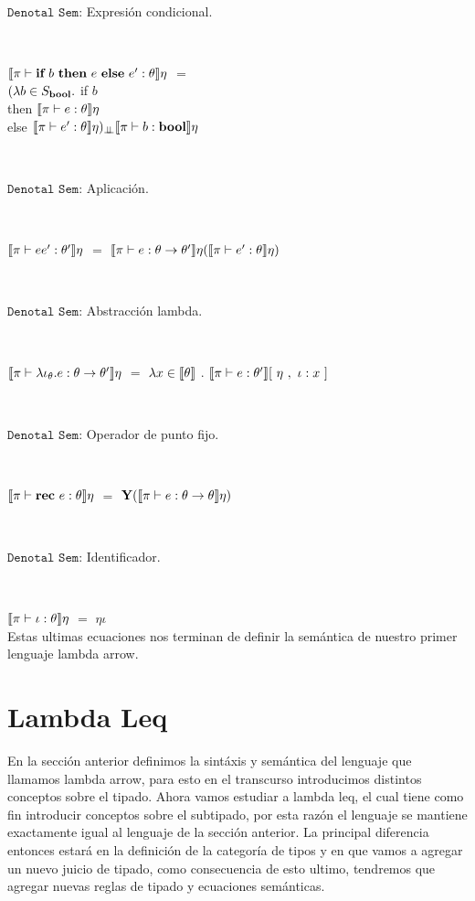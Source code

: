 \

\noindent
$\texttt{Denotal Sem:}$ Expresi\'on condicional.\

\

$\llbracket \pi \vdash \textbf{if} \ b \ \textbf{then} \ e \ \textbf{else} \ e' : \theta \rrbracket\eta$ $=$\\
		\indent \indent \indent $(\lambda b \in S_{\textbf{bool}} .$ if $b$ \\
		\indent \indent \indent \indent \indent \indent \indent 
											then $\llbracket \pi \vdash e : \theta \rrbracket\eta$\\
		\indent \indent \indent \indent \indent \indent \indent 
											else $\llbracket \pi \vdash e' : \theta \rrbracket\eta)_{\bot \!\!\! \bot}\llbracket \pi \vdash b : \textbf{bool} \rrbracket\eta$

\

\noindent
$\texttt{Denotal Sem:}$ Aplicaci\'on.\

\

$\llbracket \pi \vdash ee' : \theta' \rrbracket\eta$ $=$ $\llbracket \pi \vdash e : \theta \rightarrow \theta' \rrbracket\eta
														  (\llbracket \pi \vdash e' : \theta \rrbracket\eta)$

\

\noindent
$\texttt{Denotal Sem:}$ Abstracci\'on lambda.\

\

$\llbracket \pi \vdash \lambda \iota_{\theta} . e : \theta \rightarrow \theta' \rrbracket\eta$ $=$
						$\lambda x \in \llbracket \theta \rrbracket$ . $\llbracket \pi \vdash e : \theta' \rrbracket[\ \eta \ , \ \iota:x \ ]$
						
\

\noindent
$\texttt{Denotal Sem:}$ Operador de punto fijo.\

\

$\llbracket \pi \vdash \textbf{rec} \ e : \theta \rrbracket\eta$ $=$ $\textbf{Y} (\llbracket \pi \vdash e : \theta \rightarrow \theta \rrbracket\eta)$

\

\noindent
$\texttt{Denotal Sem:}$ Identificador.\

\

$\llbracket \pi \vdash \iota : \theta \rrbracket\eta$ $=$ $\eta \iota$\\

Estas ultimas ecuaciones nos terminan de definir la sem\'antica de nuestro 
primer lenguaje lambda arrow.

\section{Lambda Leq}

En la secci\'on anterior definimos la sint\'axis y sem\'antica del lenguaje que llamamos
lambda arrow, para esto en el transcurso introducimos distintos conceptos sobre el tipado.
Ahora vamos estudiar a lambda leq, el cual tiene como fin introducir conceptos sobre
el subtipado, por esta raz\'on el lenguaje se mantiene exactamente igual al lenguaje 
de la secci\'on anterior. La principal diferencia entonces estar\'a en la definici\'on
de la categor\'ia de tipos y en que vamos a agregar un nuevo juicio de tipado, como
consecuencia de esto ultimo, tendremos que agregar nuevas reglas de tipado y ecuaciones 
sem\'anticas.\\

